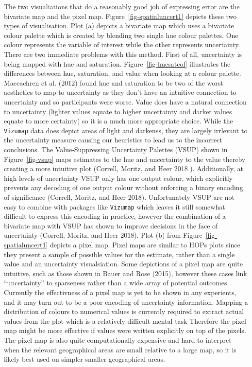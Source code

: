 \documentclass[
  letterpaper,
  DIV=11,
  numbers=noendperiod]{scrartcl}
\begin{document}
The two visualiations that do a reasonably good job of expressing error
are the bivariate map and the pixel map. Figure~\ref{fig-spatialuncert1}
depicts these two types of visualisation. Plot (a) depicts a bivariate
map which uses a bivariate colour palette which is created by blending
two single hue colour palettes. One colour represents the variable of
interest while the other represents uncertainty. There are two immediate
problems with this method. First of all, uncertainty is being mapped
with hue and saturation. Figure~\ref{fig-huesatcol} illustrates the
differences between hue, saturation, and value when looking at a colour
palette. Maceachren et al. (2012) found hue and saturation to be two of
the worst aesthetics to map to uncertainty as they don't have an
intuitive connection to uncertainty and so participants were worse.
Value does have a natural connection to uncertainty (lighter values
equate to higher uncertainty and darker values equate to more certainty)
so it is a much more appropriate choice. While the \texttt{Vizumap} data
does depict areas of light and darkenss, they are largely irrlevant to
the uncertainty measure causing our heuristics to lead us to the
incorrect conclusions. The Value-Suppressing Uncertainty Palettes (VSUP)
shown in Figure~\ref{fig-vsup} maps estimates to the hue and uncertainty
to the value thereby creating a more intuitive plot (Correll, Moritz,
and Heer 2018 ). Additionally, at high levels of uncertainty VSUP only
has one output colour, which explicitly prevents any decoding of one
output colour without enforcing a binary encoding of significance
(Correll, Moritz, and Heer 2018). Unfortunately VSUP are not easy to
combine with packages like \texttt{Vizumap} which leaves it still
somewhat difficult to express this encoding in practice, however the
combination of a bivariate map with VSUP has shown to improve decisions
in the face of uncertainty (Correll, Moritz, and Heer 2018). Plot (b)
from Figure~\ref{fig-spatialuncert1} depicts a pixel map. Pixel maps are
similar to HOPs plots since they present a sample of possible values for
the estimate, rather than a single value and an uncertainty
visualsiation. Some depictions of a pixel map are quite intuitive, such
as those shown in Bauer and Rose (2015), however these cases link
``uncertainty'' to sparseness rather than a wide array of potential
outcomes. Currently the effectivness of a pixel map is yet to be shown
in any experients, and it may turn out to be a poor encoding of
uncertainty information. Mapping a distribution of colours to numerical
values is currently required to extract actual values from the plot
which is a relatively difficult mental task Therefore the pixel map
might be more effective if values were written explicitly on top of the
pixels. The pixel map is also quite computationally expensive and hard
to interpret when the relevant geographical areas are small relative to
a large map, so it is likely best used on simpler smaller geographical
areas.
\end{document}
